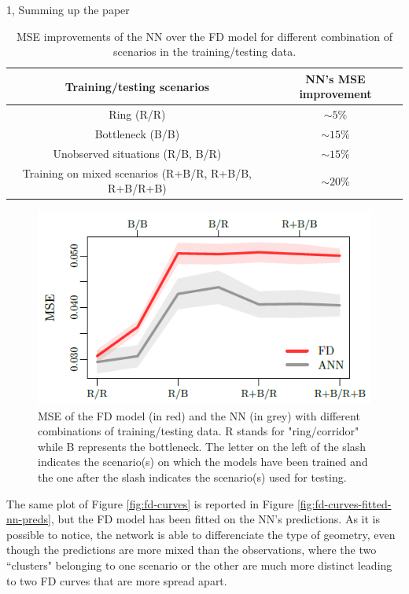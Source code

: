 \documentclass[10pt,a4paper]{article}
\begin{document}
\begin{task}{1, Summing up the paper}
\begin{table}[H]
    \centering
    \begin{tabular}{|c|c|}
        \hline
        \textbf{Training/testing scenarios} & \textbf{NN's MSE improvement}\\
        \hline
        Ring (R/R) & $\sim 5\%$\\
        Bottleneck (B/B) & $\sim 15\%$\\
        Unobserved situations (R/B, B/R) & $\sim 15\%$\\
        Training on mixed scenarios (R+B/R, R+B/B, R+B/R+B) & $\sim 20\%$\\
        \hline
    \end{tabular}
    \caption{MSE improvements of the NN over the FD model for different combination of scenarios in the training/testing data.}
    \label{tab:nn-mes-improvement}
\end{table}

\begin{figure}[h]
    \centering
    \includegraphics[scale=0.9]{images/NN_vs_FD.png}
    \caption{MSE of the FD model (in red) and the NN (in grey) with different combinations of training/testing data.
    R stands for "ring/corridor" while B represents the bottleneck.
    The letter on the left of the slash indicates the scenario(s) on which the models have been trained and the one after the slash indicates the scenario(s) used for testing.}
    \label{fig:nn-vs-fd}
\end{figure}

The same plot of Figure \ref{fig:fd-curves} is reported in Figure \ref{fig:fd-curves-fitted-nn-preds}, but the FD model has been fitted on the NN's predictions.
As it is possible to notice, the network is able to differenciate the type of geometry, even though the predictions are more mixed than the observations, where the two ``clusters" belonging to one scenario or the other are much more distinct leading to two FD curves that are more spread apart.


\end{task}
\end{document}
